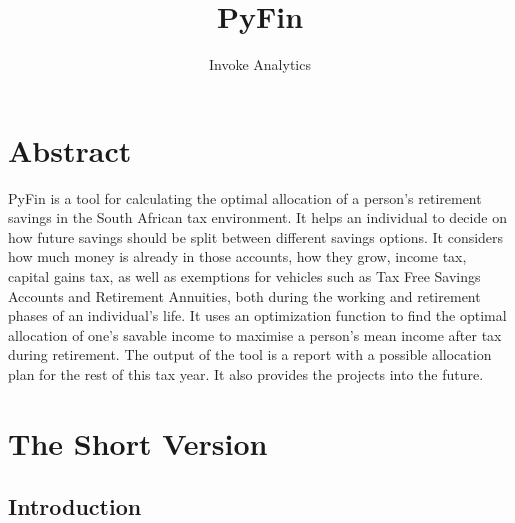 \documentclass[a4paper, justified]{tufte-handout}
\title{PyFin}
\author[]{Invoke Analytics}
\newcommand{\blankpage}{\newpage\hbox{}\thispagestyle{empty}\newpage}
\begin{document}



\maketitle


\begin{fullwidth}

\setlength{\parindent}{0pt}



\end{fullwidth}








\section{Abstract} \label{ch:intro}
PyFin is a tool for calculating the optimal allocation of a person's retirement savings in the South African tax environment. It helps an individual to decide on how future savings should be split between different savings options. It considers how much money is already in those accounts, how they grow, income tax, capital gains tax, as well as exemptions for vehicles such as Tax Free Savings Accounts and Retirement Annuities, both during the working and retirement phases of an individual's life. It uses an optimization function to find the optimal allocation of one's savable income to maximise a person's mean income after tax during retirement. The output of the tool is a report with a possible allocation plan for the rest of this tax year. It also provides the projects into the future.

\section{The Short Version}
\subsection{Introduction}
\end{document}
